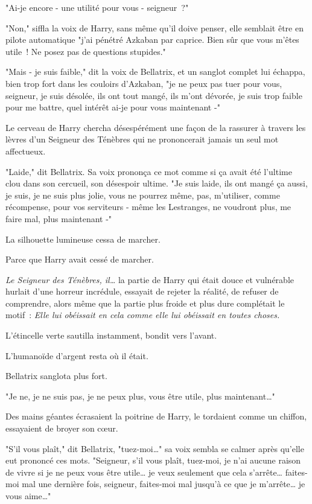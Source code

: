 "Ai-je encore - une utilité pour vous - seigneur~?"

"Non," siffla la voix de Harry, sans même qu'il doive penser, elle semblait être en pilote automatique "j'ai pénétré Azkaban par caprice. Bien sûr que vous m'êtes utile~! Ne posez pas de questions stupides."

"Mais - je suis faible," dit la voix de Bellatrix, et un sanglot complet lui échappa, bien trop fort dans les couloirs d'Azkaban, "je ne peux pas tuer pour vous, seigneur, je suis désolée, ils ont tout mangé, ils m'ont dévorée, je suis trop faible pour me battre, quel intérêt ai-je pour vous maintenant -"

Le cerveau de Harry chercha désespérément une façon de la rassurer à travers les lèvres d'un Seigneur des Ténèbres qui ne prononcerait jamais un seul mot affectueux.

"Laide," dit Bellatrix. Sa voix prononça ce mot comme si ça avait été l'ultime clou dans son cercueil, son désespoir ultime. "Je suis laide, ils ont mangé ça aussi, je suis, je ne suis plus jolie, vous ne pourrez même, pas, m'utiliser, comme récompense, pour vos serviteurs - même les Lestranges, ne voudront plus, me faire mal, plus maintenant -"

La silhouette lumineuse cessa de marcher.

Parce que Harry avait cessé de marcher.

\emph{Le Seigneur des Ténèbres, il…} la partie de Harry qui était douce et vulnérable hurlait d'une horreur incrédule, essayait de rejeter la réalité, de refuser de comprendre, alors même que la partie plus froide et plus dure complétait le motif~: \emph{Elle lui obéissait en cela comme elle lui obéissait en toutes choses.}

L'étincelle verte sautilla instamment, bondit vers l'avant.

L'humanoïde d'argent resta où il était.

Bellatrix sanglota plus fort.

"Je ne, je ne suis pas, je ne peux plus, vous être utile, plus maintenant…"

Des mains géantes écrasaient la poitrine de Harry, le tordaient comme un chiffon, essayaient de broyer son cœur.

"S'il vous plaît," dit Bellatrix, "tuez-moi…" sa voix sembla se calmer après qu'elle eut prononcé ces mots. "Seigneur, s'il vous plaît, tuez-moi, je n'ai aucune raison de vivre si je ne peux vous être utile… je veux seulement que cela s'arrête… faites-moi mal une dernière fois, seigneur, faites-moi mal jusqu'à ce que je m'arrête… je vous aime…"

